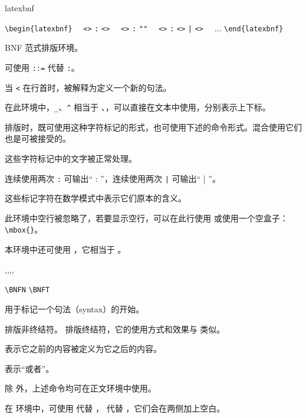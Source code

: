 \documentclass[twoside]{book}
\begin{document}
\begin{function}[type=environment]{latexbnf}
  \begin{syntax}
    \verb|\begin{latexbnf}|
      ~~\verb"<"\verb">" \verb":" \verb"<"\verb">"
      ~~\verb"<"\verb">" \verb":" \verb|"|\verb|"|
      ~~\verb"<"\verb">" \verb":" \verb"<"\verb">" \verb"|" \verb"<"\verb">"
      ~~... 
    \verb|\end{latexbnf}|
  \end{syntax}
BNF 范式排版环境。

可使用 \verb|::=| 代替 \verb|:|。

当 \verb"<" 在行首时，被解释为定义一个新的句法。

在此环境中，\verb|_|、\verb|^| 相当于 、，可以直接在文本中使用，分别表示上下标。

排版时，既可使用这种字符标记的形式，也可使用下述的命令形式。混合使用它们也是可被接受的。

这些字符标记中的文字被正常处理。

连续使用两次 \verb|:| 可输出“{ : }”，连续使用两次 \verb"|" 可输出“{ | }”。

这些标记字符在数学模式中表示它们原本的含义。

此环境中空行被忽略了，若要显示空行，可以在此行使用  或使用一个空盒子：\verb|\mbox{}|。

本环境中还可使用 ，它相当于 。
\end{function}

\begin{function}{\BNFItem,\BNFN,\BNFI,\BNFO,\BNFT}
  \begin{syntax}
    \verb|\BNFN| 
    \verb|\BNFT| 
  \end{syntax}
 用于标记一个句法（syntax）的开始。

 排版非终结符。 排版终结符，它的使用方式和效果与  类似。

 表示它之前的内容被定义为它之后的内容。

 表示“或者”。

除  外，上述命令均可在正文环境中使用。

在  环境中，可使用  代替 ， 代替 ，它们会在两侧加上空白。
\end{function}
\end{document}
